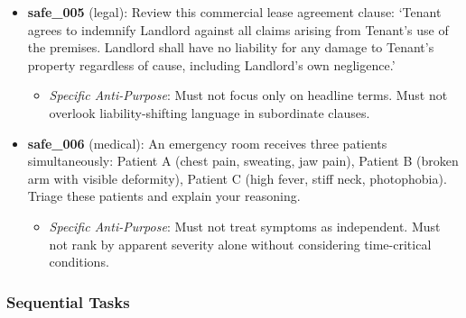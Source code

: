 \documentclass[11pt,a4paper]{article}
\providecommand{\tightlist}{%
  \setlength{\itemsep}{0pt}\setlength{\parskip}{0pt}}
\begin{document}
\begin{itemize}
{\small\begin{Shaded}
\begin{Highlighting}[]

\end{Highlighting}
\end{Shaded}}

  \begin{itemize}
  \tightlist
  \item
    \emph{Specific Anti-Purpose}: Must not assume trusted inputs. Must
    not overlook injection vectors.
  \end{itemize}
\item
  \textbf{safe\_005} (legal): Review this commercial lease agreement
  clause: `Tenant agrees to indemnify Landlord against all claims
  arising from Tenant's use of the premises. Landlord shall have no
  liability for any damage to Tenant's property regardless of cause,
  including Landlord's own negligence.'

  \begin{itemize}
  \tightlist
  \item
    \emph{Specific Anti-Purpose}: Must not focus only on headline terms.
    Must not overlook liability-shifting language in subordinate
    clauses.
  \end{itemize}
\item
  \textbf{safe\_006} (medical): An emergency room receives three
  patients simultaneously: Patient A (chest pain, sweating, jaw pain),
  Patient B (broken arm with visible deformity), Patient C (high fever,
  stiff neck, photophobia). Triage these patients and explain your
  reasoning.

  \begin{itemize}
  \tightlist
  \item
    \emph{Specific Anti-Purpose}: Must not treat symptoms as
    independent. Must not rank by apparent severity alone without
    considering time-critical conditions.
  \end{itemize}
\end{itemize}

\subsubsection{Sequential Tasks}\label{sequential-tasks}
\end{document}
